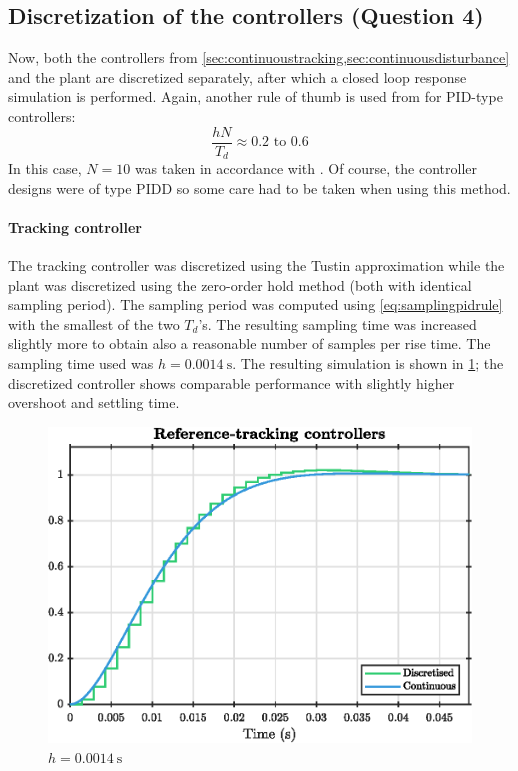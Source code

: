 \subsection{Discretization of the controllers \textnormal{\phantom{xxx}(Question 4)}}
\label{sec:discretisecontrollers}
Now, both the controllers from \cref{sec:continuoustracking,sec:continuousdisturbance} and the plant are discretized separately, after which a closed loop response simulation is performed. Again, another rule of thumb is used from \textcite[317]{astrom} for PID-type controllers:
\begin{equation}
    \frac{hN}{T_d} \approx 0.2 \text{ to } 0.6
    \label{eq:samplingpidrule}
\end{equation}
In this case, $N = 10$ was taken in accordance with \textcite{astrom}. Of course, the controller designs were of type PIDD so some care had to be taken when using this method.

\paragraph{Tracking controller}
The tracking controller was discretized using the Tustin approximation while the plant was discretized using the zero-order hold method (both with identical sampling period). The sampling period was computed using \cref{eq:samplingpidrule} with the smallest of the two $T_d$'s. The resulting sampling time was increased slightly more to obtain also a reasonable number of samples per rise time. The sampling time used was $h = \SI{0.0014}{\second}$. The resulting simulation is shown in \cref{fig:q4_dt_tracking}; the discretized controller shows comparable performance with slightly higher overshoot and settling time.
\begin{figure}[ht]
    \centering
    \includegraphics[]{media/q4/dt_tracking.eps}
    \caption{$h = \SI{0.0014}{\second}$}
    \label{fig:q4_dt_tracking}
\end{figure}

